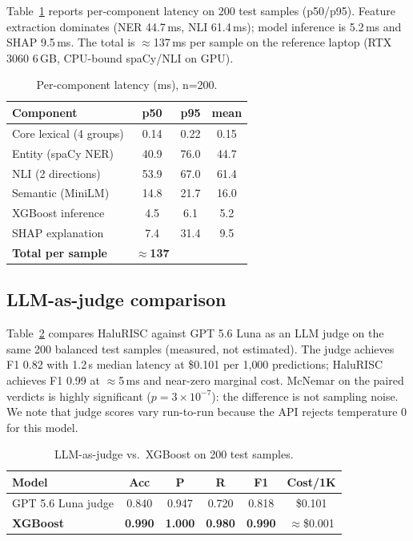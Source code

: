 Table~\ref{tab:latency} reports per-component latency on 200 test samples (p50/p95). Feature extraction dominates (NER 44.7\,ms, NLI 61.4\,ms); model inference is 5.2\,ms and SHAP 9.5\,ms. The total is $\approx$137\,ms per sample on the reference laptop (RTX 3060 6\,GB, CPU-bound spaCy/NLI on GPU).

\begin{table}[t]
\centering
\small
\caption{Per-component latency (ms), n=200.}
\label{tab:latency}
\begin{tabular}{@{}lccc@{}}
\toprule
\textbf{Component} & \textbf{p50} & \textbf{p95} & \textbf{mean} \\
\midrule
Core lexical (4 groups) & 0.14 & 0.22 & 0.15 \\
Entity (spaCy NER)      & 40.9 & 76.0 & 44.7 \\
NLI (2 directions)      & 53.9 & 67.0 & 61.4 \\
Semantic (MiniLM)       & 14.8 & 21.7 & 16.0 \\
XGBoost inference       & 4.5 & 6.1 & 5.2 \\
SHAP explanation        & 7.4 & 31.4 & 9.5 \\
\midrule
\textbf{Total per sample} & \textbf{$\approx$137} & & \\
\bottomrule
\end{tabular}
\end{table}

\subsection{LLM-as-judge comparison}

Table~\ref{tab:judge} compares HaluRISC against GPT 5.6 Luna as an LLM judge on the same 200 balanced test samples (measured, not estimated). The judge achieves F1 0.82 with 1.2\,s median latency at \$0.101 per 1{,}000 predictions; HaluRISC achieves F1 0.99 at $\approx$5\,ms and near-zero marginal cost. McNemar on the paired verdicts is highly significant ($p = 3\times10^{-7}$): the difference is not sampling noise. We note that judge scores vary run-to-run because the API rejects temperature 0 for this model.

\begin{table}[t]
\centering
\small
\caption{LLM-as-judge vs.\ XGBoost on 200 test samples.}
\label{tab:judge}
\begin{tabular}{@{}lccccc@{}}
\toprule
\textbf{Model} & \textbf{Acc} & \textbf{P} & \textbf{R} & \textbf{F1} & \textbf{Cost/1K} \\
\midrule
GPT 5.6 Luna judge & 0.840 & 0.947 & 0.720 & 0.818 & \$0.101 \\
\textbf{XGBoost}    & \textbf{0.990} & \textbf{1.000} & \textbf{0.980} & \textbf{0.990} & $\approx$\$0.001 \\
\bottomrule
\end{tabular}
\end{table}

